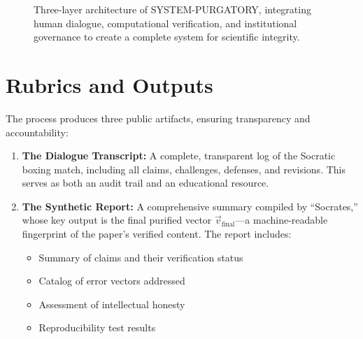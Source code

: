 \documentclass[11pt,a4paper]{article}
\begin{document}
\begin{small}
\begin{figure}[h!]
\caption{Three-layer architecture of SYSTEM-PURGATORY, integrating human dialogue, computational verification, and institutional governance to create a complete system for scientific integrity.}
\label{fig:architecture}
\end{figure}

\section{Rubrics and Outputs}
The process produces three public artifacts, ensuring transparency and accountability:

\begin{enumerate}
    \item \textbf{The Dialogue Transcript:} A complete, transparent log of the Socratic boxing match, including all claims, challenges, defenses, and revisions. This serves as both an audit trail and an educational resource.
    
    \item \textbf{The Synthetic Report:} A comprehensive summary compiled by ``Socrates,'' whose key output is the final purified vector $\vec{v}_{\text{final}}$—a machine-readable fingerprint of the paper's verified content. The report includes:
    \begin{itemize}[nosep]
        \item Summary of claims and their verification status
        \item Catalog of error vectors addressed
        \item Assessment of intellectual honesty
        \item Reproducibility test results
    \end{itemize}
    

\end{enumerate}
\end{small}
\end{document}
